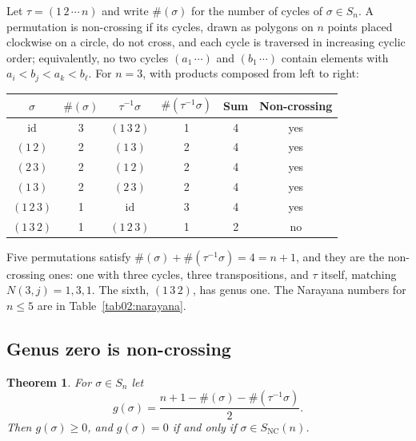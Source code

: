 \documentclass[11pt,letterpaper]{article}
\theoremstyle{plain}
\newtheorem{theorem}{Theorem}[section]
\theoremstyle{definition}
\theoremstyle{remark}
\begin{document}
Let $\tau = (1\,2\,\cdots\,n)$ and write $\#(\sigma)$ for the number of cycles of $\sigma \in S_n$. A permutation is non-crossing if its cycles, drawn as polygons on $n$ points placed clockwise on a circle, do not cross, and each cycle is traversed in increasing cyclic order; equivalently, no two cycles $(a_1\,\cdots)$ and $(b_1\,\cdots)$ contain elements with $a_i < b_j < a_k < b_\ell$. For $n = 3$, with products composed from left to right:

\begin{center}
\begin{tabular}{c|c|c|c|c|c}
$\sigma$ & $\#(\sigma)$ & $\tau^{-1}\sigma$ & $\#(\tau^{-1}\sigma)$ & Sum & Non-crossing \\
\hline
$\mathrm{id}$ & 3 & $(1\,3\,2)$ & 1 & 4 & yes \\
$(1\,2)$ & 2 & $(1\,3)$ & 2 & 4 & yes \\
$(2\,3)$ & 2 & $(1\,2)$ & 2 & 4 & yes \\
$(1\,3)$ & 2 & $(2\,3)$ & 2 & 4 & yes \\
$(1\,2\,3)$ & 1 & $\mathrm{id}$ & 3 & 4 & yes \\
$(1\,3\,2)$ & 1 & $(1\,2\,3)$ & 1 & 2 & no
\end{tabular}
\end{center}

Five permutations satisfy $\#(\sigma) + \#(\tau^{-1}\sigma) = 4 = n+1$, and they are the non-crossing ones: one with three cycles, three transpositions, and $\tau$ itself, matching $N(3,j) = 1, 3, 1$. The sixth, $(1\,3\,2)$, has genus one. The Narayana numbers for $n \le 5$ are in Table~\ref{tab02:narayana}.

\subsection{Genus zero is non-crossing}
\label{subsecA:genus_zero_proof}

\begin{theorem}
\label{thmA:genus_zero_nc}
For $\sigma \in S_n$ let
\begin{equation}
\label{eqA:genus_formula}
g(\sigma) = \frac{n + 1 - \#(\sigma) - \#(\tau^{-1}\sigma)}{2}.
\end{equation}
Then $g(\sigma) \ge 0$, and $g(\sigma) = 0$ if and only if $\sigma \in S_{\mathrm{NC}}(n)$.
\end{theorem}
\end{document}
